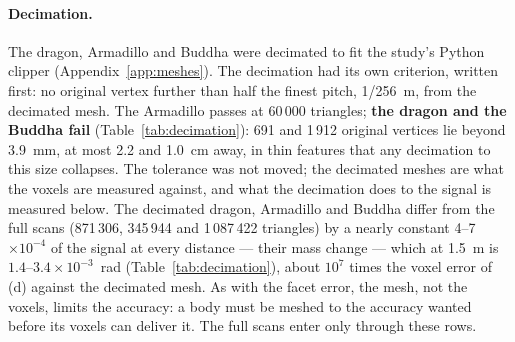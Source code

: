 \documentclass[10pt,a4paper]{article}
\newcommand{\provisional}{\textcolor{orange!70!black}{\textsf{\small[provisional --- research scripts; TASK-S5-29 regenerates this with Cavendish]}}}
\newcommand{\tagM}{\textsf{\small[measured]}}
\begin{document}
\begin{table}[tbp]\centering\scriptsize
\caption{Each mesh as one polyhedron, its field summed over every triangle (exact to the mesh). Peak
phase walking past at 1.4~m\,s$^{-1}$, centre of mass 2~m from the axis and level with the lower
launch, flight read integrated over each shot, in three poses and as a point mass; the largest
difference between poses at any one time; and the point mass's relative departure from the mesh's
static field with the centre of mass 1.5, 5 and 20~m from the axis. \tagM,
\texttt{paper-real-read/tables-regimes.md}, \texttt{data/walkpast.json}. \provisional}
\label{tab:walk}
\setlength{\tabcolsep}{4pt}

\end{table}

\paragraph{Decimation.} The dragon, Armadillo and Buddha were decimated to fit the study's Python clipper (Appendix~\ref{app:meshes}). The decimation had its own
criterion, written first: no original vertex further than half the finest pitch, 1/256~m, from the
decimated mesh. The Armadillo passes at 60\,000 triangles; \textbf{the dragon and the Buddha fail}
(Table~\ref{tab:decimation}): 691 and 1\,912 original vertices lie beyond 3.9~mm, at most 2.2 and
1.0~cm away, in thin features that any decimation to this size collapses. The tolerance was not
moved; the decimated meshes are what the voxels are measured against, and what the decimation does to
the signal is measured below. The decimated dragon, Armadillo and Buddha differ from the full
scans (871\,306, 345\,944 and 1\,087\,422 triangles) by a nearly constant 4--7$\times10^{-4}$ of the
signal at every distance --- their mass change --- which at 1.5~m is
$1.4$--$3.4\times10^{-3}$~rad (Table~\ref{tab:decimation}), about $10^7$ times the voxel error of (d)
against the decimated mesh. As with the facet error, the mesh, not the voxels, limits the accuracy: a
body must be meshed to the accuracy wanted before its voxels can deliver it. The full scans enter only through these rows.

\begin{table}[tbp]\centering\scriptsize
\caption{Decimation against the original scan (same frame, vertex-sampled both ways, point-to-triangle
distances). Pass: every original vertex within 1/256~m. The signal change is the decimated mesh's
static phase against the full scan's, both summed whole, centre of mass 1.5~m from the axis, flight
read. \tagM, \texttt{shapes/mesh-check.json}, \texttt{paper-real-read/data/exact-distance.json}.
\provisional}
\label{tab:decimation}

\end{table}
\end{document}
